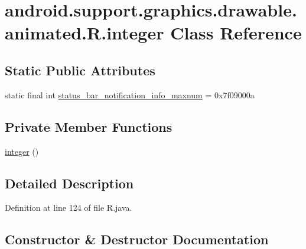 \hypertarget{classandroid_1_1support_1_1graphics_1_1drawable_1_1animated_1_1_r_1_1integer}{}\section{android.\+support.\+graphics.\+drawable.\+animated.\+R.\+integer Class Reference}
\label{classandroid_1_1support_1_1graphics_1_1drawable_1_1animated_1_1_r_1_1integer}
\subsection*{Static Public Attributes}
\begin{DoxyCompactItemize}
\item 
static final int \mbox{\hyperlink{classandroid_1_1support_1_1graphics_1_1drawable_1_1animated_1_1_r_1_1integer_a60aefdee6a7431a6f35a15a0bb57537b}{status\+\_\+bar\+\_\+notification\+\_\+info\+\_\+maxnum}} = 0x7f09000a
\end{DoxyCompactItemize}
\subsection*{Private Member Functions}
\begin{DoxyCompactItemize}
\item 
\mbox{\hyperlink{classandroid_1_1support_1_1graphics_1_1drawable_1_1animated_1_1_r_1_1integer_ae1e0697ea58961a4b30417f977d7141c}{integer}} ()
\end{DoxyCompactItemize}


\subsection{Detailed Description}


Definition at line 124 of file R.\+java.



\subsection{Constructor \& Destructor Documentation}
\mbox{\label{classandroid_1_1support_1_1graphics_1_1drawable_1_1animated_1_1_r_1_1integer_ae1e0697ea58961a4b30417f977d7141c}} 
